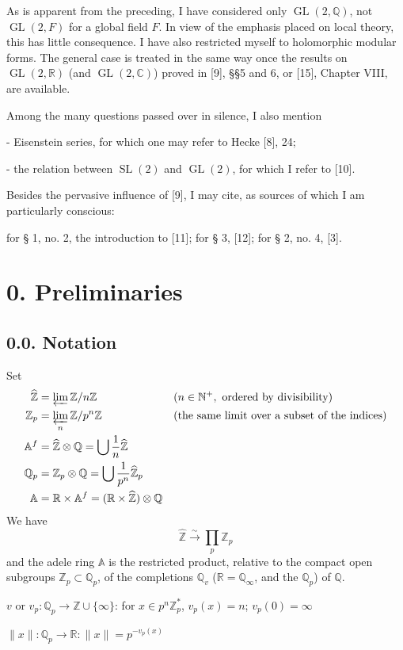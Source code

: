 \documentclass[10pt,a4paper]{article}
\providecommand{\GL}{\operatorname{GL}}
\providecommand{\SL}{\operatorname{SL}}
\providecommand{\R}{\mathbb R}
\providecommand{\Q}{\mathbb Q}
\providecommand{\Z}{\mathbb Z}
\providecommand{\C}{\mathbb C}
\providecommand{\A}{\mathbb A}
\begin{document}
As is apparent from the preceding, I have considered only $\GL(2,\Q)$, not $\GL(2,F)$ for a global field $F$. In view of the emphasis placed on local theory, this has little consequence. I have also restricted myself to holomorphic modular forms. The general case is treated in the same way once the results on $\GL(2,\R)$ (and $\GL(2,\C)$) proved in [9], §§5 and 6, or [15], Chapter VIII, are available.

Among the many questions passed over in silence, I also mention

\noindent - Eisenstein series, for which one may refer to Hecke [8], 24;

\noindent - the relation between $\SL(2)$ and $\GL(2)$, for which I refer to [10].

Besides the pervasive influence of [9], I may cite, as sources of which I am particularly conscious:

for § 1, no. 2, the introduction to [11]; for § 3, [12]; for § 2, no. 4, [3].

\clearpage
{}
\hypertarget{authority-4}{}
\section*{0. Preliminaries}
\subsection*{0.0. Notation}
Set
\[
\begin{aligned}
\widehat{\Z}&=\varprojlim\Z/n\Z &&(n\in\mathbb N^+,\text{ ordered by divisibility})\\
\Z_p&=\varprojlim_n\Z/p^n\Z &&\text{(the same limit over a subset of the indices)}\\
\A^f&=\widehat{\Z}\otimes\Q=\bigcup\frac1n\widehat{\Z}\\
\Q_p&=\Z_p\otimes\Q=\bigcup\frac1{p^n}\widehat{\Z}_p\\
\A&=\R\times\A^f=(\R\times\widehat{\Z})\otimes\Q
\end{aligned}
\]
We have
\[
\widehat{\Z}\xrightarrow{\sim}\prod_p\Z_p
\]
and the adele ring $\A$ is the restricted product, relative to the compact open subgroups $\Z_p\subset\Q_p$, of the completions $\Q_v$ ($\R=\Q_\infty$, and the $\Q_p$) of $\Q$.

\noindent $v$ or $v_p:\Q_p\longrightarrow\Z\cup\{\infty\}$: for $x\in p^n\Z_p^*$, $v_p(x)=n$; $v_p(0)=\infty$

\noindent $\|x\|:\Q_p\longrightarrow\R:\|x\|=p^{-v_p(x)}$
\end{document}
